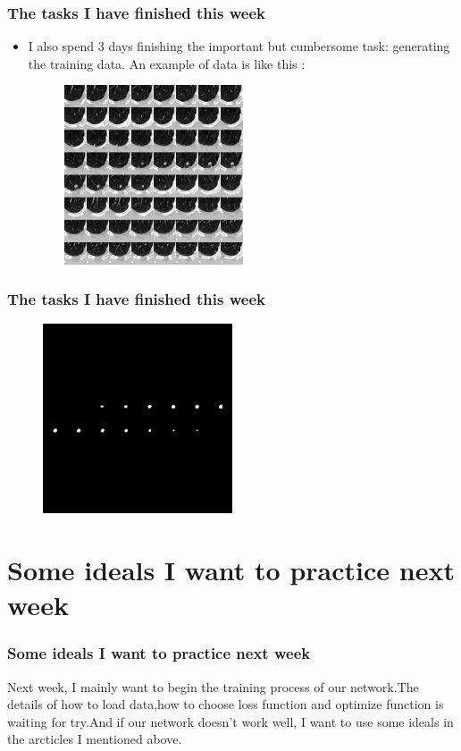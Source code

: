 \documentclass[8pt]{beamer}
\begin{document}
\begin{frame}[fragile]
\frametitle{The tasks I have finished this week}
\vspace{.3cm}
\begin{itemize}
	\item I also spend 3 days finishing the important but cumbersome task: generating the training data. An example of data is like this :\\
		\begin{figure}[H]
		\centering
		\includegraphics[width=0.5\textwidth]{data.png} 
	\end{figure}
	
	
\end{itemize}
\end{frame}

\begin{frame}[fragile]
\frametitle{The tasks I have finished this week}
\vspace{.3cm}
\begin{itemize}
	\begin{figure}[H]
		\centering
		\includegraphics[width=0.5\textwidth]{label.png} 
	\end{figure}
	
	
\end{itemize}
\end{frame}

\section*{Some ideals I want to practice next week}	
\begin{frame}[fragile]
\frametitle{Some ideals I want to practice next week}
Next week, I mainly want to begin the training process of our network.The details of how to load data,how to choose loss function and optimize function is waiting for try.And if our network doesn't work well, I want to use some ideals in the arcticles I mentioned above.
\end{frame}


\end{document}
